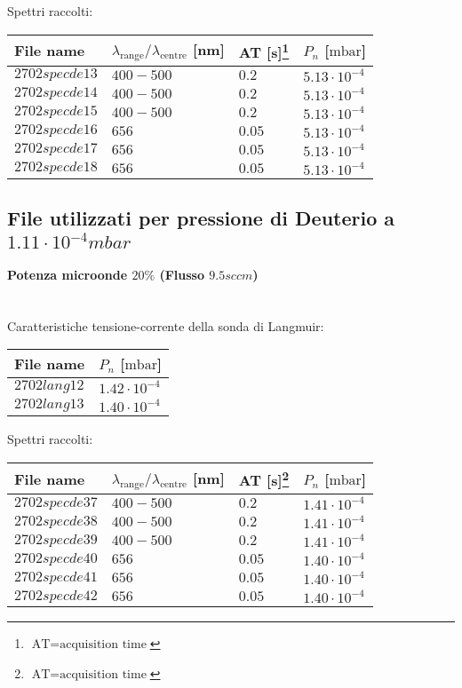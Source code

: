 Spettri raccolti:
\begin{center}
\begin{tabular}{p{3cm}p{4cm}p{2cm}p{3cm}}
\toprule
File name	&$\lambda_\text{range}\text{/}\lambda_\text{centre}$ [nm] 	&AT [s]\footnote{$\text{AT}=\text{acquisition time}$} &$P_n$ [$\si{\milli\bar}$]\\
\midrule
$2702specde13$	&$400-500$	&$0.2$		&$5.13\cdot10^{-4}$\\
$2702specde14$	&$400-500$	&$0.2$		&$5.13\cdot10^{-4}$\\
$2702specde15$	&$400-500$	&$0.2$		&$5.13\cdot10^{-4}$\\
$2702specde16$	&$656$		&$0.05$		&$5.13\cdot10^{-4}$\\
$2702specde17$	&$656$		&$0.05$		&$5.13\cdot10^{-4}$\\
$2702specde18$	&$656$		&$0.05$		&$5.13\cdot10^{-4}$\\
\bottomrule
\end{tabular}
\end{center}



\subsection{File utilizzati per pressione di Deuterio a $1.11\cdot10^{-4}mbar$}

\paragraph*{Potenza microonde $\text{20\%}$ (Flusso $9.5sccm$) }~\\
Caratteristiche tensione-corrente della sonda di Langmuir:
\begin{center}
\begin{tabular}{p{3cm}p{3cm}}
\toprule
File name	&$P_{n}$ [$\si{\milli\bar}$]\\
\midrule
$2702lang12$	&$1.42\cdot10^{-4}$\\
$2702lang13$	&$1.40\cdot10^{-4}$\\
\bottomrule
\end{tabular}
\end{center}

Spettri raccolti:
\begin{center}
\begin{tabular}{p{3cm}p{4cm}p{2cm}p{3cm}}
\toprule
File name	&$\lambda_\text{range}\text{/}\lambda_\text{centre}$ [nm] &AT [s]\footnote{$\text{AT}=\text{acquisition time}$} &$P_{n}$ [$\si{\milli\bar}$]\\
\midrule
$2702specde37$	&$400-500$	&$0.2$		&$1.41\cdot10^{-4}$\\
$2702specde38$	&$400-500$	&$0.2$		&$1.41\cdot10^{-4}$\\
$2702specde39$	&$400-500$	&$0.2$		&$1.41\cdot10^{-4}$\\
$2702specde40$	&$656$		&$0.05$		&$1.40\cdot10^{-4}$\\
$2702specde41$	&$656$		&$0.05$		&$1.40\cdot10^{-4}$\\
$2702specde42$	&$656$		&$0.05$		&$1.40\cdot10^{-4}$\\
\bottomrule
\end{tabular}
\end{center}

